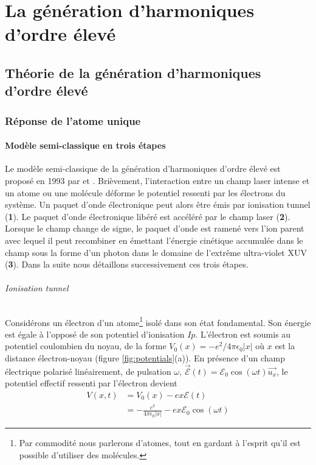 
\part{La génération d'harmoniques d'ordre élevé}
\label{part:GHOE}
\chapter{Théorie de la génération d'harmoniques d'ordre élevé}
\section{Réponse de l'atome unique}
\subsection{Modèle semi-classique en trois étapes}
Le modèle semi-classique de la génération d'harmoniques d'ordre élevé est proposé en 1993 par  et . Brièvement, l'interaction entre un champ laser intense et un atome ou une molécule déforme le potentiel ressenti par les électrons du système. Un paquet d'onde électronique peut alors être émis par ionisation tunnel (\textbf{1}). Le paquet d'onde électronique libéré est accéléré par le champ laser (\textbf{2}). Lorsque le champ change de signe, le paquet d'onde est ramené vers l'ion parent avec lequel il peut recombiner en émettant l'énergie cinétique accumulée dans le champ sous la forme d'un photon dans le domaine de l'extrême ultra-violet XUV (\textbf{3}). Dans la suite nous détaillons successivement ces trois étapes.

\paragraph{Ionisation tunnel} Considérons un électron d'un atome\footnote{Par commodité nous parlerons d'atomes, tout en gardant à l'esprit qu'il est possible d'utiliser des molécules.} isolé dans son état fondamental. Son énergie est égale à l'opposé de son potentiel d'ionisation $Ip$. L'électron est soumis au potentiel coulombien du noyau, de la forme $V_0 (x) = - e^2 /4\pi \epsilon_0 |x|$ où $x$ est la distance électron-noyau (figure \ref{fig:potentials}(a)). En présence d'un champ électrique polarisé linéairement, de pulsation $\omega$, $\vec{\mathcal{E}}(t) = \mathcal{E}_0 \cos(\omega t) \vec{u_x}$, le potentiel effectif ressenti par l'électron devient
\begin{align}
V(x,t) & = V_0 (x) - e x \mathcal{E}(t) \\
& = -\frac{e^2}{4\pi \epsilon_0 |x|} - e x \mathcal{E}_0 \cos(\omega t)
\label{eq:PotentielEffectif}
\end{align}

